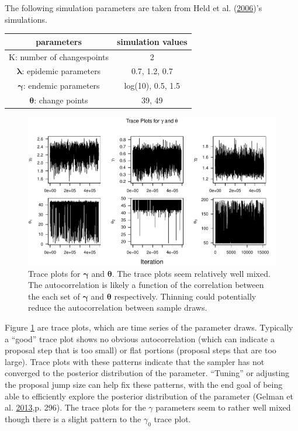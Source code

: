 \documentclass[11pt,a4paper]{article}
\numberwithin{equation}{section}
\begin{document}
The following simulation parameters are taken from Held et al.
(\protect\hyperlink{ref-held_two-component_2006}{2006})'s simulations.

\begin{longtable}[]{@{}cc@{}}
\toprule
parameters & simulation values\tabularnewline
\midrule
\endhead
K: number of changespoints & 2\tabularnewline
\(\boldsymbol{\lambda}\): epidemic parameters & 0.7, 1.2,
0.7\tabularnewline
\(\boldsymbol{\gamma}\): endemic parameters & log(10), 0.5,
1.5\tabularnewline
\(\boldsymbol{\theta}\): change points & 39, 49\tabularnewline
\bottomrule
\end{longtable}

\begin{figure}
\centering
\includegraphics{thesis_draft_files/figure-latex/lambda_traces_plot-1.pdf}
\caption{\label{fig:lam_trace} Trace plots for \(\boldsymbol{\gamma}\)
and \(\boldsymbol{\theta}\). The trace plots seem relatively well mixed.
The autocorrelation is likely a function of the correlation between the
each set of \(\boldsymbol{\gamma}\) and \(\boldsymbol{\theta}\)
respectively. Thinning could potentially reduce the autocorrelation
between sample draws.}
\end{figure}

Figure \ref{fig:lam_trace} are trace plots, which are time series of the
parameter draws. Typically a ``good'' trace plot shows no obvious
autocorrelation (which can indicate a proposal step that is too small)
or flat portions (proposal steps that are too large). Trace plots with
these patterns indicate that the sampler has not converged to the
posterior distribution of the parameter. ``Tuning'' or adjusting the
proposal jump size can help fix these patterns, with the end goal of
being able to efficiently explore the posterior distribution of the
parameter (Gelman et al.
\protect\hyperlink{ref-gelman_bayesian_2013}{2013},p. 296). The trace
plots for the \(\gamma\) parameters seem to rather well mixed though
there is a slight pattern to the \(\gamma_0\) trace plot.
\end{document}
